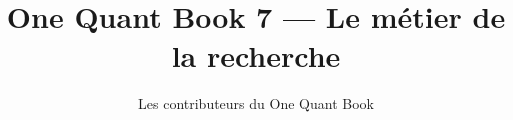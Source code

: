 \documentclass[11pt,a4paper,twoside,openany]{book}
\title{One Quant Book 7 --- Le métier de la recherche}
\author{Les contributeurs du One Quant Book}
\date{\bookdate}
\begin{document}
\frontmatter



\tableofcontents

\mainmatter


\appendix
\part{\omsolutionspart}


\backmatter
\printindex
\end{document}
